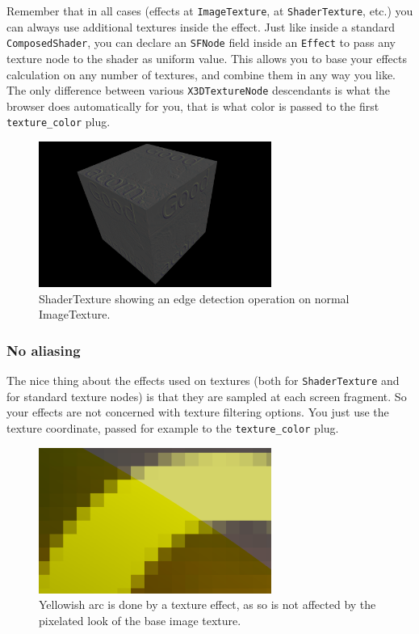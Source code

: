 \documentclass{acmsiggraph}                     %
\begin{document}
Remember that in all cases (effects at \texttt{ImageTexture},
at \texttt{ShaderTexture}, etc.) you can always use additional
textures inside the effect. Just like inside a standard \texttt{ComposedShader},
you can declare an \texttt{SFNode} field inside an \texttt{Effect}
to pass any texture node to the shader as uniform value.
This allows you to base your effects calculation on any number of textures,
and combine them in any way you like. The only difference
between various \texttt{X3DTextureNode} descendants is what the browser
does automatically for you, that is what color is passed
to the first \texttt{texture\_color} plug.

\begin{figure}[H]
  \centering
  \includegraphics[width=3in]{shader_texture_edge_detection}
  \caption{ShaderTexture showing an edge detection operation on normal ImageTexture.}
\end{figure}

\subsubsection{No aliasing}

The nice thing about the effects used on textures (both for \texttt{ShaderTexture}
and for standard texture nodes) is that they are sampled at each
screen fragment. So your effects are not concerned with texture filtering
options. You just use the texture coordinate, passed for example to the
\texttt{texture\_color} plug.

\begin{figure}[H]
  \centering
  \includegraphics[width=3in]{shader_texture_no_filtering_problems}
  \caption{Yellowish arc is done by a texture effect, as so is not
    affected by the pixelated look of the base image texture.}
\end{figure}
\end{document}
